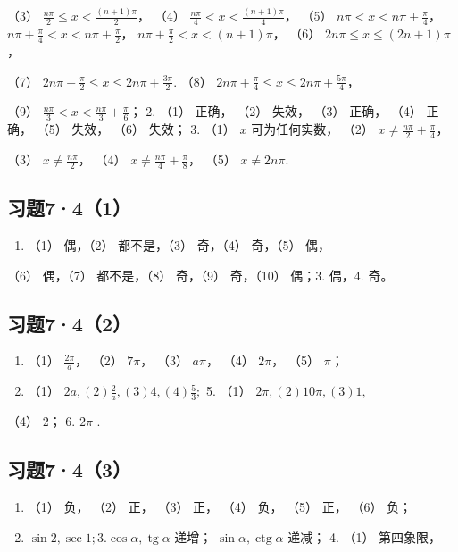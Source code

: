 （3） \(\frac{n\pi}{2} \leqslant x < \frac{(n+1)\pi}{2}\)， （4）
\(\frac{n\pi}{4} < x < \frac{(n+1)\pi}{4}\)， （5）
\(n\pi < x < n\pi + \frac{\pi}{4}\)，
\(n\pi + \frac{\pi}{4} < x < n\pi + \frac{\pi}{2}\)，
\(n\pi + \frac{\pi}{2} < x < (n+1)\pi\)， （6）
\(2n\pi \leqslant x \leqslant (2n+1)\pi\)，

（7）
\(2n\pi + \frac{\pi}{2} \leqslant x \leqslant 2n\pi + \frac{3\pi}{2}\).
（8）
\(2n\pi + \frac{\pi}{4} \leqslant x \leqslant 2n\pi + \frac{5\pi}{4}\)，

（9） \(\frac{n\pi}{3} < x < \frac{n\pi}{3} + \frac{\pi}{6}\)； 2. （1）
正确， （2） 失效， （3） 正确， （4） 正确， （5） 失效， （6） 失效；
3. （1） \(x\) 可为任何实数， （2）
\(x \neq \frac{n\pi}{2} + \frac{\pi}{4}\)，

（3） \(x \neq \frac{n\pi}{2}\)， （4）
\(x \neq \frac{n\pi}{4} + \frac{\pi}{8}\)， （5） \(x \neq 2n\pi\).

\subsection{习题7·4（1）}

\begin{enumerate}
\item
  （1） 偶，（2） 都不是，（3） 奇，（4） 奇，（5） 偶，
\end{enumerate}

（6） 偶，（7） 都不是，（8） 奇，（9） 奇，（10） 偶；3. 偶，4. 奇。

\subsection{习题7·4（2）}

\begin{enumerate}[start=2]
\item
  （1） \(\frac{2\pi}{a}\)， （2） \(7\pi\)， （3） \(a\pi\)， （4）
  \(2\pi\)， （5） \(\pi\)；
\item
  （1） \(2a, (2)\frac{2}{a}, (3)4, (4)\frac{5}{3};\) 5. （1）
  \(2\pi, (2)10\pi, (3)1,\)
\end{enumerate}

（4） 2； 6. \(2\pi\) .

\subsection{习题7·4（3）}

\begin{enumerate}
\item
  （1） 负， （2） 正， （3） 正， （4） 负， （5） 正， （6） 负；
\item
  \(\sin 2, \sec 1; 3. \cos \alpha, \operatorname{tg} \alpha\) 递增；
  \(\sin \alpha, \operatorname{ctg} \alpha\) 递减； 4. （1） 第四象限，
\end{enumerate}


